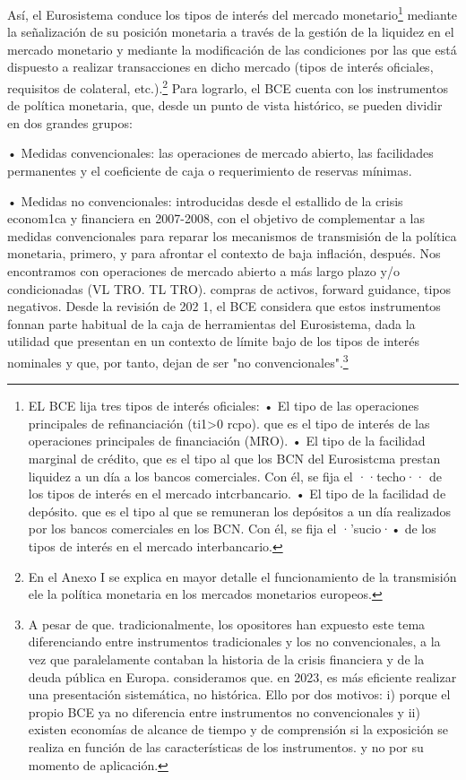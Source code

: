 \documentclass[10pt,a4paper]{article}
\begin{document}
{Así, el Eurosistema conduce los tipos de interés del mercado monetario\footnote{%
    EL BCE lija tres tipos de interés oficiales: • El tipo de las operaciones principales de refinanciación (ti1>0 rcpo). que es el tipo de interés de las operaciones principales de financiación (MRO). • El tipo de la facilidad marginal de crédito, que es el tipo al que los BCN del Eurosistcma prestan liquidez a un día a los bancos comerciales. Con él, se fija el ··techo·· de los tipos de interés en el mercado intcrbancario. • El tipo de la facilidad de depósito. que es el tipo al que se remuneran los depósitos a un día realizados por los bancos comerciales en los BCN. Con él, se fija el ·'sucio·• de los tipos de interés en el mercado interbancario.
} mediante la señalización de su posición monetaria a través de la gestión de la liquidez en el mercado monetario y mediante la modificación de las condiciones por las que está dispuesto a realizar transacciones en dicho mercado (tipos de interés oficiales, requisitos de colateral, etc.).\footnote{%
    En el Anexo I se explica en mayor detalle el funcionamiento de la transmisión ele la política monetaria en los mercados monetarios europeos.
} Para lograrlo, el BCE cuenta con los instrumentos de política monetaria, que, desde un punto de vista histórico, se pueden dividir en dos grandes grupos:

• Medidas convencionales: las operaciones de mercado abierto, las facilidades permanentes y el coeficiente de caja o requerimiento de reservas mínimas.

• Medidas no convencionales: introducidas desde el estallido de la crisis econom1ca y financiera en 2007-2008, con el objetivo de complementar a las medidas convencionales para reparar los mecanismos de transmisión de la política monetaria, primero, y para afrontar el contexto de baja inflación, después. Nos encontramos con operaciones de mercado abierto a más largo plazo y/o condicionadas (VL TRO. TL TRO). compras de activos, forward guidance, tipos negativos. Desde la revisión de 202 1, el BCE considera que estos instrumentos fonnan parte habitual de la caja de herramientas del Eurosistema, dada la utilidad que presentan en un contexto de límite bajo de los tipos de interés nominales y que, por tanto, dejan de ser "no convencionales".\footnote{%
    A pesar de que. tradicionalmente, los opositores han expuesto este tema diferenciando entre instrumentos tradicionales y los no convencionales, a la vez que paralelamente contaban la historia de la crisis financiera y de la deuda pública en Europa. consideramos que. en 2023, es más eficiente realizar una presentación sistemática, no histórica. Ello por dos motivos: i) porque el propio BCE ya no diferencia entre instrumentos no convencionales y ii) existen economías de alcance de tiempo y de comprensión si la exposición se realiza en función de las características de los instrumentos. y no por su momento de aplicación.
}

}
\end{document}
